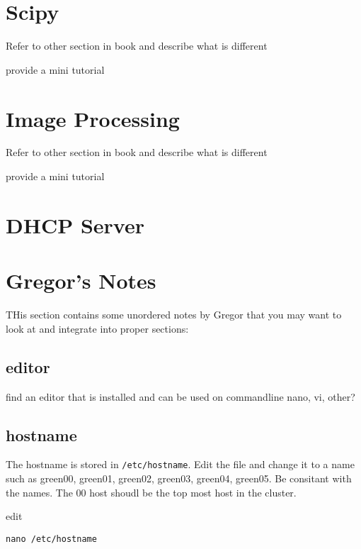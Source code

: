 \section{Scipy}

Refer to other section in book and describe what is different

\begin{exercise}
provide a mini tutorial 
\end{exercise}

\section{Image Processing}

Refer to other section in book and describe what is different

\begin{exercise}
provide a mini tutorial 
\end{exercise}

\section{DHCP Server}


\section{Gregor's Notes}

THis section contains some unordered notes by Gregor that you may want
to look at and integrate into proper sections:

\subsection{editor}

find an editor that is installed and can be used on commandline nano, vi, other?
\subsection{hostname}

The hostname is stored in \verb|/etc/hostname|. Edit the file and
change it to a name such as green00, green01, green02, green03, green04,
green05. Be consitant with the names. The 00 host shoudl be the top
most host in the cluster.

edit

\begin{lstlisting}
nano /etc/hostname
\end{lstlisting}

